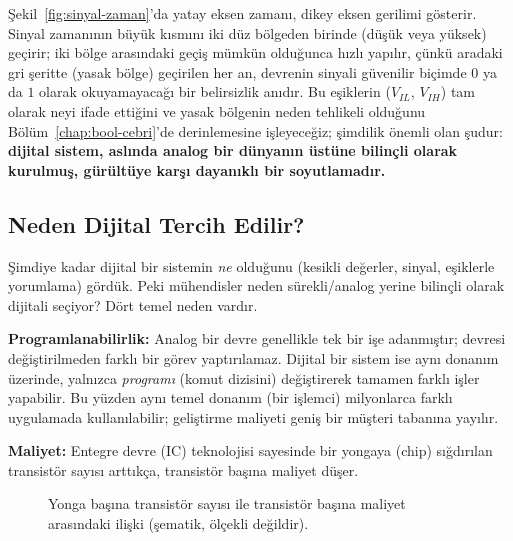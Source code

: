 Şekil~\ref{fig:sinyal-zaman}'da yatay eksen zamanı, dikey eksen gerilimi gösterir. Sinyal
zamanının büyük kısmını iki düz bölgeden birinde (düşük veya yüksek) geçirir; iki bölge
arasındaki geçiş mümkün olduğunca hızlı yapılır, çünkü aradaki gri şeritte (yasak bölge)
geçirilen her an, devrenin sinyali güvenilir biçimde $0$ ya da $1$ olarak okuyamayacağı bir
belirsizlik anıdır. Bu eşiklerin ($V_{IL}$, $V_{IH}$) tam olarak neyi ifade ettiğini ve yasak
bölgenin neden tehlikeli olduğunu Bölüm~\ref{chap:bool-cebri}'de derinlemesine işleyeceğiz;
şimdilik önemli olan şudur: \textbf{dijital sistem, aslında analog bir dünyanın üstüne
bilinçli olarak kurulmuş, gürültüye karşı dayanıklı bir soyutlamadır.}

\subsection{Neden Dijital Tercih Edilir?}
\label{sec:neden-dijital}

Şimdiye kadar dijital bir sistemin \emph{ne} olduğunu (kesikli değerler, sinyal, eşiklerle
yorumlama) gördük. Peki mühendisler neden sürekli/analog yerine bilinçli olarak dijitali
seçiyor? Dört temel neden vardır.

\textbf{Programlanabilirlik:} Analog bir devre genellikle tek bir işe adanmıştır; devresi
değiştirilmeden farklı bir görev yaptırılamaz. Dijital bir sistem ise aynı donanım üzerinde,
yalnızca \emph{programı} (komut dizisini) değiştirerek tamamen farklı işler yapabilir. Bu
yüzden aynı temel donanım (bir işlemci) milyonlarca farklı uygulamada kullanılabilir;
geliştirme maliyeti geniş bir müşteri tabanına yayılır.

\textbf{Maliyet:} Entegre devre (IC) teknolojisi sayesinde bir yongaya (chip) sığdırılan
transistör sayısı arttıkça, transistör başına maliyet düşer.

\begin{figure}[H]
\centering
{}
\caption{Yonga başına transistör sayısı ile transistör başına maliyet arasındaki ilişki
(şematik, ölçekli değildir).}
\label{fig:transistor-maliyet}
\end{figure}

